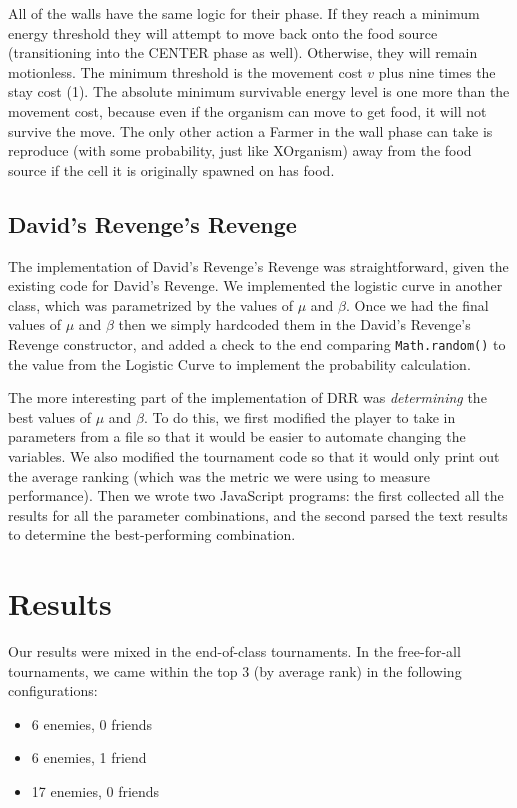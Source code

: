 \documentclass[
10pt, %
letterpaper, %
oneside, %
headinclude,footinclude, %
english
]{article}
\begin{document}
All of the walls have the same logic for their phase. If they reach a minimum energy threshold they will attempt to move back onto the food source (transitioning into the CENTER phase as well). Otherwise, they will remain motionless. The minimum threshold is the movement cost $v$ plus nine times the stay cost (1). The absolute minimum survivable energy level is one more than the movement cost, because even if the organism can move to get food, it will not survive the move. The only other action a Farmer in the wall phase can take is reproduce (with some probability, just like XOrganism) away from the food source if the cell it is originally spawned on has food.

\subsection{David's Revenge's Revenge}

The implementation of David's Revenge's Revenge was straightforward, given the existing code for David's Revenge. We implemented the logistic curve in another class, which was parametrized by the values of $\mu$ and $\beta$. Once we had the final values of $\mu$ and $\beta$ then we simply hardcoded them in the David's Revenge's Revenge constructor, and added a check to the end comparing \texttt{Math.random()} to the value from the Logistic Curve to implement the probability calculation.

The more interesting part of the implementation of DRR was \textit{determining} the best values of $\mu$ and $\beta$. To do this, we first modified the player to take in parameters from a file so that it would be easier to automate changing the variables. We also modified the tournament code so that it would only print out the average ranking (which was the metric we were using to measure performance). Then we wrote two JavaScript programs: the first collected all the results for all the parameter combinations, and the second parsed the text results to determine the best-performing combination.

\section{Results}
Our results were mixed in the end-of-class tournaments. In the free-for-all tournaments, we came within the top 3 (by average rank) in the following configurations:
\begin{itemize}
  \item 6 enemies, 0 friends
  \item 6 enemies, 1 friend
  \item 17 enemies, 0 friends
\end{itemize}
\end{document}
